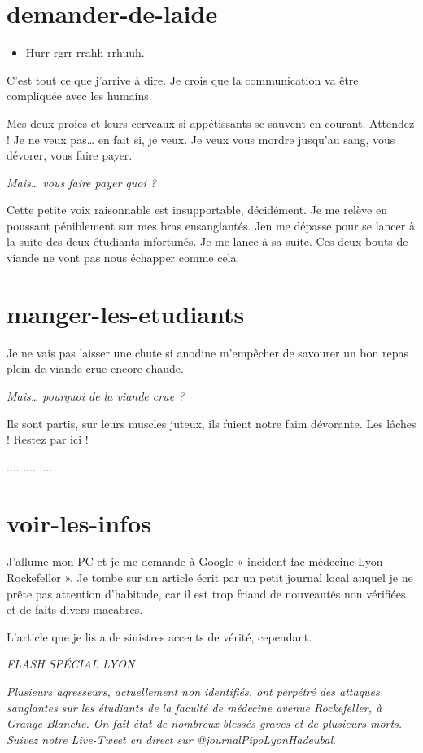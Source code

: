 \section{demander-de-laide}

\begin{itemize}
\item Hurr rgrr rrahh rrhuuh.
\end{itemize}

C'est tout ce que j'arrive à dire. Je crois que la communication va être compliquée avec les humains.

Mes deux proies et leurs cerveaux si appétissants se sauvent en courant. Attendez ! Je ne veux pas… en fait si, je veux. Je veux vous mordre jusqu'au sang, vous dévorer, vous faire payer.

\textit{Mais… vous faire payer quoi ?}

Cette petite voix raisonnable est insupportable, décidément. Je me relève en poussant péniblement sur mes bras ensanglantés. Jen me dépasse pour se lancer à la suite des deux étudiants infortunés. Je me lance à sa suite. Ces deux bouts de viande ne vont pas nous échapper comme cela.

\section{manger-les-etudiants} 

Je ne vais pas laisser une chute si anodine m'empêcher de savourer un bon repas plein de viande crue encore chaude.

\textit{Mais… pourquoi de la viande crue ?}

Ils sont partis, sur leurs muscles juteux, ils fuient notre faim dévorante. Les lâches ! Restez par ici !

.... .... ....

\section{voir-les-infos}

J'allume mon PC et je me demande à Google « incident fac médecine Lyon Rockefeller ». Je tombe sur un article écrit par un petit journal local auquel je ne prête pas attention d'habitude, car il est trop friand de nouveautés non vérifiées et de faits divers macabres.

L'article que je lis a de sinistres accents de vérité, cependant.

\begin{center}
\textit{FLASH SPÉCIAL LYON}

\textit{Plusieurs agresseurs, actuellement non identifiés, ont perpétré des attaques sanglantes sur les étudiants de la faculté de médecine avenue Rockefeller, à Grange Blanche. On fait état de nombreux blessés graves et de plusieurs morts. Suivez notre Live-Tweet en direct sur @journalPipoLyonHadeubal}.
\end{center}

